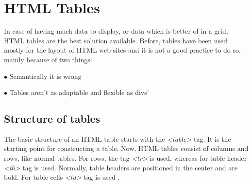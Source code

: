 %
%
%
%
%


\chapter{HTML Tables}

\label{HTML5 Tables}

In case of having much data to display, or data which is better of in a grid, HTML tables
are the best solution available. Before, tables have been used mostly for the layout of
HTML web-sites and it is not a good practice to do so, mainly because of two things:


$\bullet$ Semantically it is wrong

$\bullet$ Tables aren't as adaptable and flexible as divs'

\section{Structure of tables}

The basic structure of an HTML table starts with the \textit{<table>} tag. It is the starting
point for constructing a table. Now, HTML tables consist of columns and rows, like normal
tables. For rows, the tag  \textit{<tr>} is used, whereas for table header \textit{<th>} tag
is used. Normally, table headers are positioned in the center and are bold. For table cells
\textit{<td>} tag is used \parencite{7}.
\newpage

